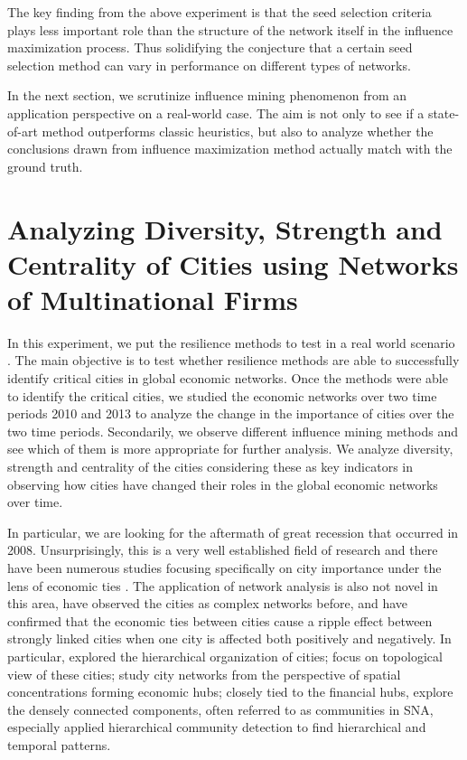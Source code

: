 	The key finding from the above experiment is that the seed selection criteria plays less important role than the structure of the network itself in the influence maximization process. Thus solidifying the conjecture that a certain seed selection method can vary in performance on different types of networks.
	
	In the next section, we scrutinize influence mining phenomenon from an application perspective on a real-world case. The aim is not only to see if a state-of-art method outperforms classic heuristics, but also to analyze whether the conclusions drawn from influence maximization method actually match with the ground truth.


	\section{Analyzing Diversity, Strength and Centrality of Cities using Networks of Multinational Firms}
	\label{sec:resilience-city-networks}
	In this experiment, we put the resilience methods to test in a real world scenario \cite{hussain2019}. The main objective is to test whether resilience methods are able to successfully identify critical cities in global economic networks. Once the methods were able to identify the critical cities, we studied the economic networks over two time periods 2010 and 2013 to analyze the change in the importance of cities over the two time periods. Secondarily, we observe different influence mining methods and see which of them is more appropriate for further analysis. We analyze diversity, strength and centrality of the cities considering these as key indicators in observing how cities have changed their roles in the global economic networks over time.
	
	In particular, we are looking for the aftermath of great recession that occurred in 2008. Unsurprisingly, this is a very well established field of research and there have been numerous studies focusing specifically on city importance under the lens of economic ties \cite{blumenfeld2009,storper1997,scott2003}. The application of network analysis is also not novel in this area, \cite{barabasi1999,ducruet2014,liu2014} have observed the cities as complex networks before, and have confirmed that the economic ties between cities cause a ripple effect between strongly linked cities when one city is affected both positively and negatively. In particular, \cite{derudder2003,liu2014} explored the hierarchical organization of cities; \cite{taylor2002,taylor2013,alderson2004} focus on topological view of these cities; \cite{sassen2007,sassen2011} study city networks from the perspective of spatial concentrations forming economic hubs; closely tied to the financial hubs, \cite{ducruet2011,beaverstock2002} explore the densely connected components, often referred to as communities in SNA, especially \cite{liu2014} applied hierarchical community detection to find hierarchical and temporal patterns.
	
